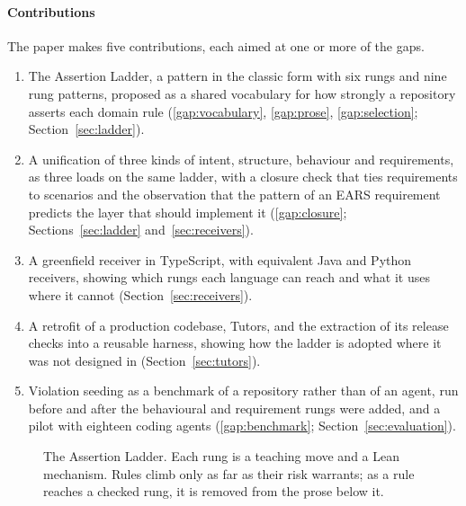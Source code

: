 \paragraph{Contributions} The paper makes five contributions, each aimed at one or more of
the gaps.
\begin{enumerate}
  \item The Assertion Ladder, a pattern in the classic form \citep{alexander1977pattern,gamma1994design}
    with six rungs and nine rung patterns, proposed as a shared vocabulary for how strongly a
    repository asserts each domain rule (\ref{gap:vocabulary}, \ref{gap:prose},
    \ref{gap:selection}; Section~\ref{sec:ladder}).
  \item A unification of three kinds of intent, structure, behaviour and requirements, as three
    loads on the same ladder, with a closure check that ties requirements to scenarios and the
    observation that the pattern of an EARS requirement \citep{mavin2009ears} predicts the layer
    that should implement it (\ref{gap:closure}; Sections~\ref{sec:ladder}
    and~\ref{sec:receivers}).
  \item A greenfield receiver in TypeScript, with equivalent Java and Python receivers, showing
    which rungs each language can reach and what it uses where it cannot
    (Section~\ref{sec:receivers}).
  \item A retrofit of a production codebase, Tutors, and the extraction of its release checks
    into a reusable harness, showing how the ladder is adopted where it was not designed in
    (Section~\ref{sec:tutors}).
  \item Violation seeding as a benchmark of a repository rather than of an agent, run before and
    after the behavioural and requirement rungs were added, and a pilot with eighteen coding
    agents (\ref{gap:benchmark}; Section~\ref{sec:evaluation}).
\end{enumerate}

\begin{figure}[t]
  \centering
  \resizebox{\linewidth}{!}{}
  \caption{The Assertion Ladder. Each rung is a teaching move and a Lean mechanism. Rules climb
  only as far as their risk warrants; as a rule reaches a checked rung, it is removed from the
  prose below it.}
  \label{fig:ladder}
\end{figure}
